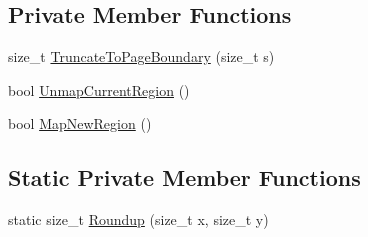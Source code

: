 \subsection*{Private Member Functions}
\begin{DoxyCompactItemize}
\item 
size\+\_\+t \hyperlink{classleveldb_1_1anonymous__namespace_02env__posix_8cc_03_1_1_posix_mmap_file_ab83ec8b9ef11a1780c4ef58ab82d8a98}{Truncate\+To\+Page\+Boundary} (size\+\_\+t s)
\item 
bool \hyperlink{classleveldb_1_1anonymous__namespace_02env__posix_8cc_03_1_1_posix_mmap_file_aff7b7326c7b7ddb10ad327eb4c943ccd}{Unmap\+Current\+Region} ()
\item 
bool \hyperlink{classleveldb_1_1anonymous__namespace_02env__posix_8cc_03_1_1_posix_mmap_file_abf3168d158a0c63550fd514ebf7c6ee6}{Map\+New\+Region} ()
\end{DoxyCompactItemize}
\subsection*{Static Private Member Functions}
\begin{DoxyCompactItemize}
\item 
static size\+\_\+t \hyperlink{classleveldb_1_1anonymous__namespace_02env__posix_8cc_03_1_1_posix_mmap_file_a33760c00bffb3dccc48f432ca3150405}{Roundup} (size\+\_\+t x, size\+\_\+t y)
\end{DoxyCompactItemize}
